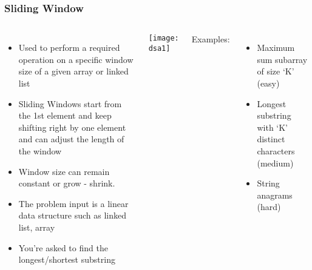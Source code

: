 \begin{frame}[fragile]
	\frametitle{Sliding Window}
	
	\begin{columns}[T]
			\begin{itemize}
				\item Used to perform a required operation on a specific window size of a given array or linked list
				\item Sliding Windows start from the 1st element and keep shifting right by one element and can adjust the length of the window 
				\item Window size can remain constant or grow - shrink.
				\item The problem input is a linear data structure such as linked list, array
				\item You’re asked to find the longest/shortest substring
			\end{itemize}
			
		
\begin{center}
\texttt{[image: dsa1]}
\end{center}	

Examples:
			\begin{itemize}
				\item Maximum sum subarray of size ‘K’ (easy)
				\item Longest substring with ‘K’ distinct characters (medium)
				\item String anagrams (hard)
			\end{itemize}
			
	\end{columns}		
\end{frame}

